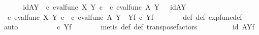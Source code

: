 \begin{isabellebody}
\isanewline
\ \ \isamarkupfalse%
\isanewline
\ \ \isamarkupfalse%
\ idAY{\isacharcolon}{\kern0pt}\ {\isachardoublequoteopen}{\isacharparenleft}{\kern0pt}{\isasymphi}\ {\isasymcirc}\isactrlsub c\ eval{\isacharunderscore}{\kern0pt}func\ X\ Y{\isacharparenright}{\kern0pt}\isactrlsup {\isasymsharp}\ {\isasymcirc}\isactrlsub c\ {\isacharparenleft}{\kern0pt}{\isasympsi}\ {\isasymcirc}\isactrlsub c\ eval{\isacharunderscore}{\kern0pt}func\ A\ Y{\isacharparenright}{\kern0pt}\isactrlsup {\isasymsharp}\ \ {\isacharequal}{\kern0pt}\ id{\isacharparenleft}{\kern0pt}A\isactrlbsup Y\isactrlesup {\isacharparenright}{\kern0pt}{\isachardoublequoteclose}\isanewline
\ \ \isamarkupfalse%
\ {\isacharminus}{\kern0pt}\ \isanewline
\ \ \ \ \isamarkupfalse%
\ {\isachardoublequoteopen}{\isacharparenleft}{\kern0pt}{\isasymphi}\ {\isasymcirc}\isactrlsub c\ eval{\isacharunderscore}{\kern0pt}func\ X\ Y{\isacharparenright}{\kern0pt}\isactrlsup {\isasymsharp}\ {\isasymcirc}\isactrlsub c\ {\isacharparenleft}{\kern0pt}{\isasympsi}\ {\isasymcirc}\isactrlsub c\ eval{\isacharunderscore}{\kern0pt}func\ A\ Y{\isacharparenright}{\kern0pt}\isactrlsup {\isasymsharp}\ {\isacharequal}{\kern0pt}\ {\isasymphi}\isactrlbsup Y\isactrlesup \isactrlsub f\ {\isasymcirc}\isactrlsub c\ {\isasympsi}\isactrlbsup Y\isactrlesup \isactrlsub f{\isachardoublequoteclose}\isanewline
\ \ \ \ \ \ \isamarkupfalse%
\ {\isasymphi}{\isacharunderscore}{\kern0pt}def\ {\isasympsi}{\isacharunderscore}{\kern0pt}def\ exp{\isacharunderscore}{\kern0pt}func{\isacharunderscore}{\kern0pt}def{}\ \isamarkupfalse%
\ auto\isanewline
\ \ \ \ \isamarkupfalse%
\ \isamarkupfalse%
\ {\isachardoublequoteopen}{\isachardot}{\kern0pt}{\isachardot}{\kern0pt}{\isachardot}{\kern0pt}\ {\isacharequal}{\kern0pt}\ {\isacharparenleft}{\kern0pt}{\isasymphi}\ {\isasymcirc}\isactrlsub c\ {\isasympsi}{\isacharparenright}{\kern0pt}\isactrlbsup Y\isactrlesup \isactrlsub f{\isachardoublequoteclose}\isanewline
\ \ \ \ \ \ \isamarkupfalse%
\ {\isacharparenleft}{\kern0pt}metis\ {\isasymphi}{\isacharunderscore}{\kern0pt}def\ {\isasympsi}{\isacharunderscore}{\kern0pt}def\ transpose{\isacharunderscore}{\kern0pt}factors{\isacharparenright}{\kern0pt}\isanewline
\ \ \ \ \isamarkupfalse%
\ \isamarkupfalse%
\ {\isachardoublequoteopen}{\isachardot}{\kern0pt}{\isachardot}{\kern0pt}{\isachardot}{\kern0pt}\ {\isacharequal}{\kern0pt}\ {\isacharparenleft}{\kern0pt}id\ A{\isacharparenright}{\kern0pt}\isactrlbsup Y\isactrlesup \isactrlsub f{\isachardoublequoteclose}\isanewline

\end{isabellebody}
